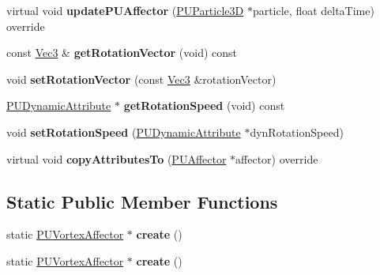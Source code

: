 \begin{DoxyCompactItemize}
\item 
\mbox{\label{classPUVortexAffector_a1f0ec711de26114d312292b6ff446f3e}} 
virtual void {\bfseries update\+P\+U\+Affector} (\hyperlink{structPUParticle3D}{P\+U\+Particle3D} $\ast$particle, float delta\+Time) override
\item 
\mbox{\label{classPUVortexAffector_a4492c59c427a163aaef0ee31f22f2491}} 
const \hyperlink{classVec3}{Vec3} \& {\bfseries get\+Rotation\+Vector} (void) const
\item 
\mbox{\label{classPUVortexAffector_a715351b9c83fa5affb6e49cdbb467f87}} 
void {\bfseries set\+Rotation\+Vector} (const \hyperlink{classVec3}{Vec3} \&rotation\+Vector)
\item 
\mbox{\label{classPUVortexAffector_acb9e3109fb800303be183bf4904e3ad9}} 
\hyperlink{classPUDynamicAttribute}{P\+U\+Dynamic\+Attribute} $\ast$ {\bfseries get\+Rotation\+Speed} (void) const
\item 
\mbox{\label{classPUVortexAffector_ad5f124d204aa77d03a0bacf664b56f2c}} 
void {\bfseries set\+Rotation\+Speed} (\hyperlink{classPUDynamicAttribute}{P\+U\+Dynamic\+Attribute} $\ast$dyn\+Rotation\+Speed)
\item 
\mbox{\label{classPUVortexAffector_a32a1db8d650a51a7f698aa99efff3bf8}} 
virtual void {\bfseries copy\+Attributes\+To} (\hyperlink{classPUAffector}{P\+U\+Affector} $\ast$affector) override
\end{DoxyCompactItemize}
\subsection*{Static Public Member Functions}
\begin{DoxyCompactItemize}
\item 
\mbox{\label{classPUVortexAffector_a652b9c431ef6bb4dc8d9f10741181627}} 
static \hyperlink{classPUVortexAffector}{P\+U\+Vortex\+Affector} $\ast$ {\bfseries create} ()
\item 
\mbox{\label{classPUVortexAffector_a737b598cd2907999b4b8c9d64aba695c}} 
static \hyperlink{classPUVortexAffector}{P\+U\+Vortex\+Affector} $\ast$ {\bfseries create} ()
\end{DoxyCompactItemize}
